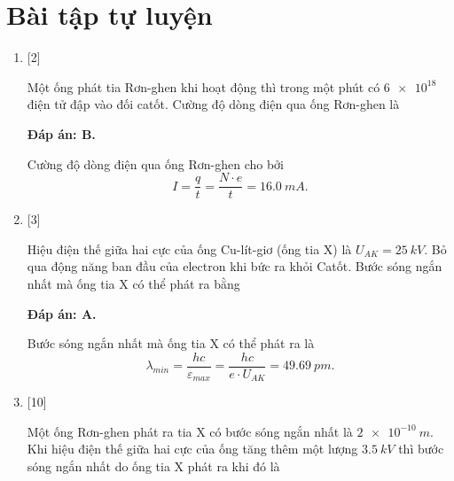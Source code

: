 \section{Bài tập tự luyện}
\begin{enumerate}[label=\bfseries Câu \arabic*:]

\item {} [2]

\cauhoi
{Một ống phát tia Rơn-ghen khi hoạt động thì trong một phút có $\num{6e18}$ điện tử đập vào đối catốt. Cường độ dòng điện qua ống Rơn-ghen là
}

\loigiai
{		\textbf{Đáp án: B.}

Cường độ dòng điện qua ống Rơn-ghen cho bởi
$$
I = \dfrac{q}{t} = \dfrac{N\cdot e}{t} = \SI{16,0}{mA}.
$$
}

\item {} [3]

\cauhoi
{Hiệu điện thế giữa hai cực của ống Cu-lít-giơ (ống tia X) là $U_{AK} = \SI{25}{kV}$. Bỏ qua động năng ban đầu của electron khi bức ra khỏi Catốt. Bước sóng ngắn nhất mà ống tia X có thể phát ra bằng
}

\loigiai
{		\textbf{Đáp án: A.}

Bước sóng ngắn nhất mà ống tia X có thể phát ra là
$$
\lambda_{min} = \dfrac{hc}{\varepsilon_{max}} = \dfrac{hc}{e \cdot U_{AK}} = \SI{49,69}{pm}.
$$
}

\item {} [10]

\cauhoi
{Một ống Rơn-ghen phát ra tia X có bước sóng ngắn nhất là $\SI{2e-10}{m}$. Khi hiệu điện thế giữa hai cực của ống tăng thêm một lượng $\SI{3,5}{kV}$ thì bước sóng ngắn nhất do ống tia X phát ra khi đó là
}


\end{enumerate}
